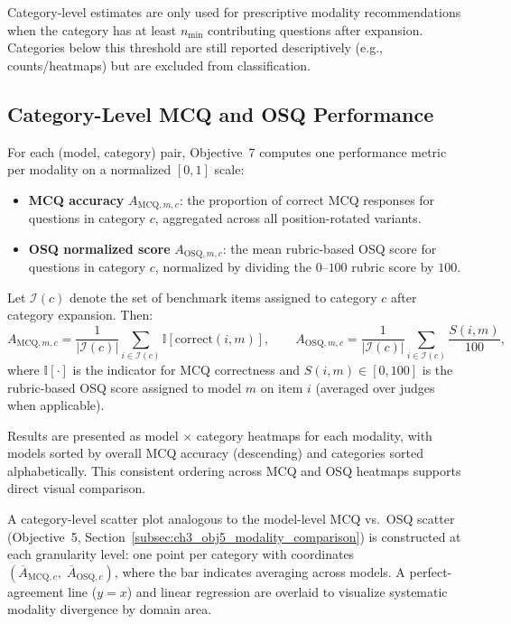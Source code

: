 Category-level estimates are only used for prescriptive modality recommendations when the category has at least $n_{\min}$ contributing questions after expansion. Categories below this threshold are still reported descriptively (e.g., counts/heatmaps) but are excluded from classification.


\subsection{Category-Level MCQ and OSQ Performance}
\label{subsec:ch3_obj7_performance}

For each (model, category) pair, Objective~7 computes one performance metric per modality on a normalized $[0,1]$ scale:

\begin{itemize}[nosep]
    \item \textbf{MCQ accuracy} $A_{\text{MCQ},m,c}$: the proportion of correct MCQ responses for questions in category $c$, aggregated across all position-rotated variants.
    \item \textbf{OSQ normalized score} $A_{\text{OSQ},m,c}$: the mean rubric-based OSQ score for questions in category $c$, normalized by dividing the $0$--$100$ rubric score by $100$.
\end{itemize}

Let $\mathcal{I}(c)$ denote the set of benchmark items assigned to category $c$ after category expansion. Then:
\[
A_{\text{MCQ},m,c}=\frac{1}{|\mathcal{I}(c)|}\sum_{i\in \mathcal{I}(c)} \mathbb{I}\!\left[\text{correct}(i,m)\right],
\qquad
A_{\text{OSQ},m,c}=\frac{1}{|\mathcal{I}(c)|}\sum_{i\in \mathcal{I}(c)} \frac{S(i,m)}{100},
\]
where $\mathbb{I}[\cdot]$ is the indicator for MCQ correctness and $S(i,m)\in[0,100]$ is the rubric-based OSQ score assigned to model $m$ on item $i$ (averaged over judges when applicable).

Results are presented as model $\times$ category heatmaps for each modality, with models sorted by overall MCQ accuracy (descending) and categories sorted alphabetically. This consistent ordering across MCQ and OSQ heatmaps supports direct visual comparison.

A category-level scatter plot analogous to the model-level MCQ vs.\ OSQ scatter (Objective~5, Section~\ref{subsec:ch3_obj5_modality_comparison}) is constructed at each granularity level: one point per category with coordinates $(\overline{A}_{\text{MCQ},c},\; \overline{A}_{\text{OSQ},c})$, where the bar indicates averaging across models. A perfect-agreement line ($y=x$) and linear regression are overlaid to visualize systematic modality divergence by domain area.


